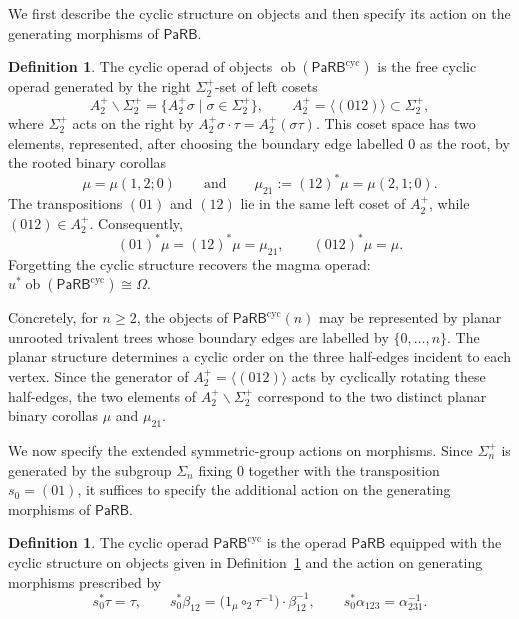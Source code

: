 \documentclass{amsart}
\newcommand{\PaRB}{\mathsf{PaRB}}
\newcommand{\magma}{\mathsf{\Omega}}
\newcommand{\twist}{\tau}
\newcommand{\ob}{\operatorname{ob}}
\theoremstyle{definition}
\newtheorem{definition}[theorem]{Definition}%
\numberwithin{equation}{section}
\begin{document}
We first describe the cyclic structure on objects and then specify its action on the generating morphisms of $\PaRB$.

\begin{definition}
\label{def: objects of cyclic PaRB}
The cyclic operad of objects $\ob(\PaRB^{\mathrm{cyc}})$ is the free
cyclic operad generated by the right $\Sigma_2^+$-set of left cosets
\[
A_2^+\backslash\Sigma_2^+
=
\{A_2^+\sigma \mid \sigma\in\Sigma_2^+\},
\qquad
A_2^+=\langle(012)\rangle \subset\Sigma_2^{+},
\]
where $\Sigma_2^+$ acts on the right by $A_2^+\sigma\cdot\tau =
A_2^+(\sigma\tau)$. This coset space has two elements, represented,
after choosing the boundary edge labelled $0$ as the root, by the
rooted binary corollas
\[
\mu=\mu(1,2;0)
\qquad\text{and}\qquad
\mu_{21}:=(12)^*\mu=\mu(2,1;0).
\]
The transpositions $(01)$ and $(12)$ lie in the same left coset of
$A_2^+$, while $(012)\in A_2^+$. Consequently,
\[
(01)^*\mu=(12)^*\mu=\mu_{21},
\qquad
(012)^*\mu=\mu.
\]
Forgetting the cyclic structure recovers the magma operad:
$u^*\ob(\PaRB^{\mathrm{cyc}})\cong\magma$.
\end{definition}

Concretely, for $n \geq 2$, the objects of $\PaRB^{\mathrm{cyc}}(n)$
may be represented by planar unrooted trivalent trees whose boundary
edges are labelled by $\{0,\ldots,n\}$. The planar structure
determines a cyclic order on the three half-edges incident to each
vertex. Since the generator of $A_2^+ = \langle (012) \rangle$ acts
by cyclically rotating these half-edges, the two elements of
$A_2^+ \backslash \Sigma_2^+$ correspond to the two distinct
planar binary corollas $\mu$ and $\mu_{21}$. %

We now specify the extended symmetric-group actions on morphisms.
Since $\Sigma_n^+$ is generated by the subgroup $\Sigma_n$ fixing
$0$ together with the transposition $s_0=(01)$, it suffices to
specify the additional action on the generating morphisms of
$\PaRB$.

\begin{definition}
\label{def: cyclic PaRB}
The cyclic operad $\PaRB^{\mathrm{cyc}}$ is the operad $\PaRB$
equipped with the cyclic structure on objects given in
Definition~\ref{def: objects of cyclic PaRB} and the action on
generating morphisms prescribed by
\begin{equation}
\label{eq: cyclic action PaRB generators}
s_0^*\twist = \twist,
\qquad
s_0^*\beta_{12}
= \bigl(1_\mu\circ_2\twist^{-1}\bigr)\cdot\beta_{12}^{-1},
\qquad
s_0^*\alpha_{123} = \alpha_{231}^{-1}.
\end{equation}
\end{definition}
\end{document}
